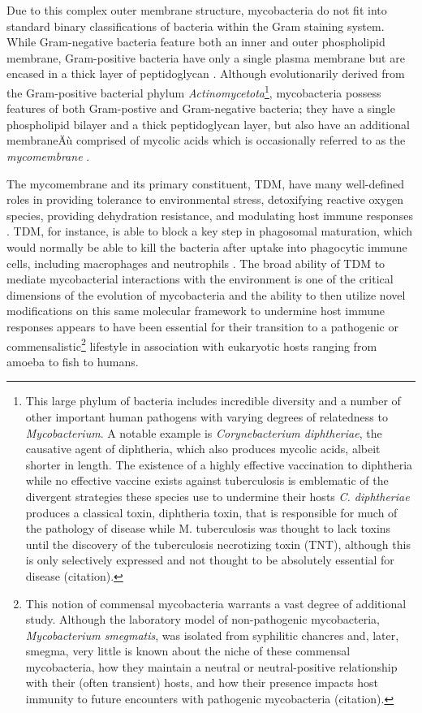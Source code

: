Due to this complex outer membrane structure, mycobacteria do not fit into standard binary classifications of bacteria within the Gram staining system. While Gram-negative bacteria feature both an inner and outer phospholipid membrane, Gram-positive bacteria have only a single plasma membrane but are encased in a thick layer of peptidoglycan \citep{Carlone1982, Salton1953}. Although evolutionarily derived from the Gram-positive bacterial phylum \textit{Actinomycetota}\footnote{This large phylum of bacteria includes incredible diversity and a number of other important human pathogens with varying degrees of relatedness to \textit{Mycobacterium}. A notable example is \textit{Corynebacterium diphtheriae}, the causative agent of diphtheria, which also produces mycolic acids, albeit shorter in length. The existence of a highly effective vaccination to diphtheria while no effective vaccine exists against tuberculosis is emblematic of the divergent strategies these species use to undermine their hosts \textit{C. diphtheriae} produces a classical toxin, diphtheria toxin, that is responsible for much of the pathology of disease while M. tuberculosis was thought to lack toxins until the discovery of the tuberculosis necrotizing toxin (TNT), although this is only selectively expressed and not thought to be absolutely essential for disease (citation).}, mycobacteria possess features of both Gram-postive and Gram-negative bacteria; they have a single phospholipid bilayer and a thick peptidoglycan layer, but also have an additional membraneÄù comprised of mycolic acids which is occasionally referred to as the \textit{mycomembrane} \citep{Jankute2015, Brennan2003,  Brennan1995, Chatterjee1997}.

The mycomembrane and its primary constituent, TDM, have many well-defined roles in providing tolerance to environmental stress, detoxifying reactive oxygen species, providing dehydration resistance, and modulating host immune responses \citep{Lima2001, Ryll2001, Harland2008, Patin207}. TDM, for instance, is able to block a key step in phagosomal maturation, which would normally be able to kill the bacteria after uptake into phagocytic immune cells, including macrophages and neutrophils \citep{Axelrod2008, Indrigo2008, Spargo1991}. The broad ability of TDM to mediate mycobacterial interactions with the environment is one of the critical dimensions of the evolution of mycobacteria and the ability to then utilize novel modifications on this same molecular framework to undermine host immune responses appears to have been essential for their transition to a pathogenic or commensalistic\footnote{This notion of commensal mycobacteria warrants a vast degree of additional study. Although the laboratory model of non-pathogenic mycobacteria, \textit{Mycobacterium smegmatis}, was isolated from syphilitic chancres and, later, smegma, very little is known about the niche of these commensal mycobacteria, how they maintain a neutral or neutral-positive relationship with their (often transient) hosts, and how their presence impacts host immunity to future encounters with pathogenic mycobacteria (citation).} lifestyle in association with eukaryotic hosts ranging from amoeba to fish to humans.

